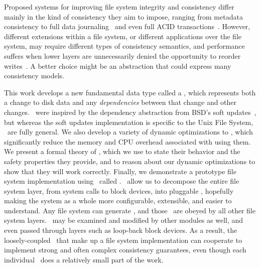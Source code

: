Proposed systems for improving file system integrity and consistency differ
 mainly in the kind of consistency they aim to impose, ranging from
 metadata consistency to full data journaling~\cite{tweedie98journaling}
  and even full ACID
 transactions~\cite{gal05transactional,liskov04transactional}.
%
However, different extensions within a file system, or different
 applications over the file system, may require different types of
 consistency semantics, and performance suffers when lower layers are
 unnecessarily denied the opportunity to reorder
 writes~\cite{ganger00soft}.
%
A better choice might be an abstraction that could express many consistency
 models.


This work develops a new fundamental data type called a \emph{\chdesc},
 which represents both a change to disk data and any \emph{dependencies}
 between that change and other changes. 
%
\Chdescs\ were inspired by the dependency abstraction from BSD's
 soft updates~\cite{ganger00soft}, but whereas the soft updates implementation
 is specific to the Unix File System, \chdescs\ are fully general.
%
We also develop a variety of dynamic optimizations to \chdescs, which
 significantly reduce the memory and CPU overhead associated with using them.
%
We present a formal theory of \chdescs, which we use to state their
 behavior and the safety properties they provide, and to reason about our
 dynamic optimizations to show that they will work correctly.
%
Finally, we demonstrate a prototype file system implementation using
 \chdescs\ called \Kudos.
%
\Chdescs\ allow us to decompose the entire file system layer, from system
 calls to block devices, into pluggable \modules, hopefully making the
 system as a whole more configurable, extensible, and easier to understand.
%
Any file system can generate \chdescs, and those \chdescs\ are obeyed
 by all other file system layers.
%
\Chdescs\ may be examined and modified by other modules as well, and
 even passed through layers such as loop-back block devices.
%
As a result, the loosely-coupled \modules\ that make up a file system
 implementation can cooperate to implement strong and often complex
 consistency guarantees, even though each individual \module\ does a
 relatively small part of the work.


